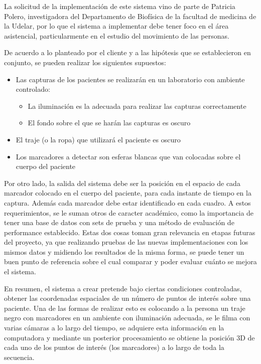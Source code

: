 La solicitud de la implementación de este sistema vino de parte de Patricia Polero, investigadora del Departamento de Biofísica de la facultad de medicina de la Udelar, por lo que el sistema a implementar debe tener foco en el área asistencial, particularmente en el estudio del movimiento de las personas.

De acuerdo a lo planteado por el cliente y a las hipótesis que se establecieron en conjunto, se pueden realizar los siguientes supuestos:
\begin{itemize}
\item Las capturas de los pacientes se realizarán en un laboratorio con ambiente controlado:
	\begin{itemize}
		 \item La iluminación es la adecuada para realizar las  capturas correctamente
		 \item El fondo sobre el que se harán las capturas es oscuro
	\end{itemize}
\item El traje (o la ropa) que utilizará el paciente es oscuro
\item Los marcadores a detectar son esferas blancas que van colocadas sobre el cuerpo del paciente
\end{itemize}

Por otro lado, la salida del sistema debe ser la posición en el espacio de cada marcador colocado en el cuerpo del paciente, para cada instante de tiempo en la captura. Además cada marcador debe estar identificado en cada cuadro. A estos requerimientos, se le suman otros de caracter académico, como la importancia de tener una base de datos con sets de prueba y una método de evaluación de performance establecido. Estas dos cosas toman gran relevancia en etapas futuras del proyecto, ya que realizando pruebas de las nuevas implementaciones con los mismos datos y midiendo los resultados de la misma forma, se puede tener un buen punto de referencia sobre el cual comparar y poder evaluar cuánto se mejora el sistema.

En resumen, el sistema a crear pretende bajo ciertas condiciones controladas, obtener las coordenadas espaciales de un número de puntos de interés sobre una paciente. Una de las formas de realizar esto es colocando a la persona un traje negro con marcadores en un ambiente con iluminación adecuada, se le filma con varias cámaras a lo largo del tiempo, se adquiere esta información en la computadora y mediante un posterior procesamiento se obtiene la posición 3D de cada uno de los puntos de interés (los marcadores) a lo largo de toda la secuencia.

